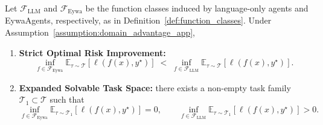 \begin{theorem}
\label{thm:eywaagent_improvement_app}
Let $\mathcal{F}_{\mathrm{LLM}}$ and $\mathcal{F}_{\mathrm{Eywa}}$ be the function classes induced by language-only agents and EywaAgents, respectively, as in Definition~\ref{def:function_classes}. Under Assumption~\ref{assumption:domain_advantage_app},
\begin{enumerate}
    \item \textbf{Strict Optimal Risk Improvement:}
    \begin{equation}
    \inf_{f\in\mathcal{F}_{\mathrm{Eywa}}}\mathbb{E}_{\tau\sim\mathcal{T}}[\ell(f(x),y^\star)]
    \;<\;
    \inf_{f\in\mathcal{F}_{\mathrm{LLM}}}\mathbb{E}_{\tau\sim\mathcal{T}}[\ell(f(x),y^\star)].
    \end{equation}
    \item \textbf{Expanded Solvable Task Space:} there exists a non-empty task family $\mathcal{T}_1\subset\mathcal{T}$ such that
    \begin{equation}
    \inf_{f\in\mathcal{F}_{\mathrm{Eywa}}}\mathbb{E}_{\tau\sim\mathcal{T}_1}[\ell(f(x),y^\star)] = 0,
    \qquad
    \inf_{f\in\mathcal{F}_{\mathrm{LLM}}}\mathbb{E}_{\tau\sim\mathcal{T}_1}[\ell(f(x),y^\star)] > 0.
    \end{equation}
\end{enumerate}
\end{theorem}
